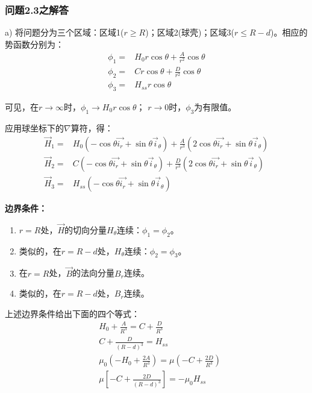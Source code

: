 \subsubsection*{问题2.3之解答}
a) 将问题分为三个区域：区域1($r\ge R$)；区域2(球壳)；区域3($r\le R-d$)。相应的势函数分别为：
\begin{align}
  \phi_1 =& H_0 r\cos\theta+\frac{A}{r^2}\cos\theta \tag{S3.1a} \\
  \phi_2 =& C r \cos\theta+\frac{D}{r^2}\cos\theta\tag{S3.1b} \\
  \phi_3 =& H_{ss} r\cos\theta  \tag{S3.1c}
\end{align}

可见，在$r\rightarrow \infty$时，$\phi_1 \rightarrow H_0 r\cos\theta$；
$r\rightarrow 0$时，$\phi_3$为有限值。

应用球坐标下的$\nabla$算符，得：
\begin{align}
  \vec{H}_1 =& H_0 (-\cos\theta\vec{i_r}+\sin\theta\vec{i}_\theta)+\frac{A}{r^3} (2\cos\theta\vec{i_r}+\sin\theta\vec{i}_\theta) \tag{S3.2a}\\
  \vec{H}_2 =& C(-\cos\theta\vec{i_r}+\sin\theta\vec{i}_\theta)+\frac{D}{r^3} (2\cos\theta\vec{i_r}+\sin\theta\vec{i}_\theta)  \tag{S3.2b}\\
   \vec{H}_3 =& H_{ss}  (-\cos\theta\vec{i_r}+\sin\theta\vec{i}_\theta)  \tag{S3.2c}
\end{align}

\noindent\textbf{边界条件：}

\begin{enumerate}
  \item $r=R$处，$\vec{H}$的切向分量$H_\theta$连续：$\phi_1=\phi_2$。
  \item 类似的，在$r=R-d$处，$H_\theta$连续：$\phi_2=\phi_3  $。
  \item 在$r=R$处，$\vec{B}$的法向分量$B_r$连续。
  \item 类似的，在$r=R-d$处，$B_r$连续。
\end{enumerate}

上述边界条件给出下面的四个等式：
\begin{align}
  &H_0+\frac{A}{R^3}= C+\frac{D}{R^3} \nonumber \tag{S3.3a}\\
  &C+\frac{D}{\left(R-d\right)^3}= H_{ss} \nonumber \tag{S3.3b}\\
  &\mu_0\left(-H_0+\frac{2A}{R^3}\right)= \mu\left(-C+\frac{2D}{R^3}\right)\nonumber \tag{S3.3c} \\
  &\mu\left[-C+\frac{2D}{(R-d)^3}\right]= -\mu_0 H_{ss} \nonumber\tag{S3.3d}
\end{align}

